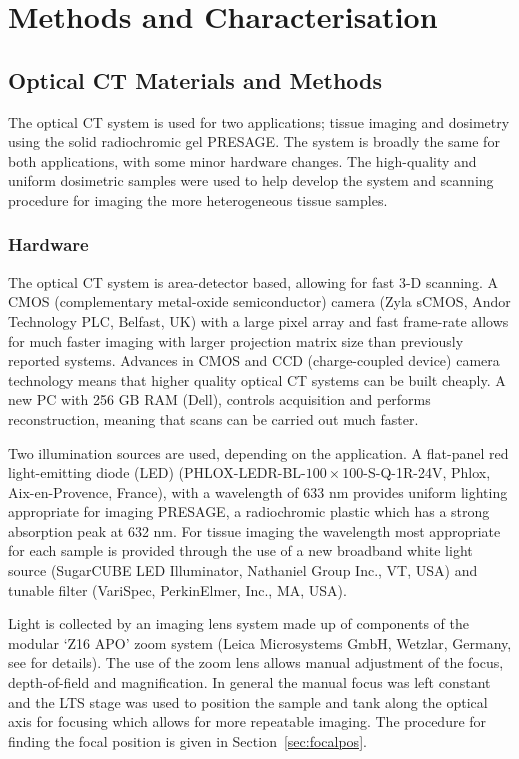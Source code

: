 \chapter{Methods and Characterisation}

\section{Optical CT Materials and Methods}
\label{sec:opticalCTmeth}
The optical CT system is used for two applications; tissue imaging and dosimetry using the solid radiochromic gel PRESAGE\textregistered. The system is broadly the same for both applications, with some minor hardware changes. The high-quality and uniform dosimetric samples were used to help develop the system and scanning procedure for imaging the more heterogeneous tissue samples.



\subsection{Hardware}
The  optical CT system is area-detector based, allowing for fast 3-D scanning. A CMOS (complementary metal-oxide semiconductor) camera (Zyla sCMOS, Andor Technology PLC, Belfast, UK) with a large pixel array and fast frame-rate allows for much faster imaging with larger projection matrix size than previously reported systems. Advances in CMOS and CCD (charge-coupled device) camera technology means that higher quality optical CT systems can be built cheaply.  A new PC with 256 GB RAM (Dell), controls acquisition and performs reconstruction, meaning that scans can be carried out much faster. 

Two illumination sources are used, depending on the application. A flat-panel red light-emitting diode (LED) 
(PHLOX-LEDR-BL-$100\times100$-S-Q-1R-24V, Phlox, Aix-en-Provence, France), with a wavelength of 633 nm provides uniform lighting appropriate for imaging PRESAGE\texttrademark , a radiochromic plastic which has a strong absorption peak at 632 nm. 
For tissue imaging the wavelength most appropriate for each sample is provided through the use of a  new broadband white light source (SugarCUBE LED Illuminator, Nathaniel Group Inc., VT, USA) and tunable filter (VariSpec, PerkinElmer, Inc., MA, USA). 

Light is collected by an imaging lens system made up of  components of the modular `Z16 APO' zoom system  (Leica Microsystems GmbH, Wetzlar, Germany, see \cite{Doran:2010hn} for details). The use of the zoom lens allows manual adjustment of the focus, depth-of-field and magnification. In general the manual focus was left constant and the LTS stage was used to position the sample and tank along the optical axis for focusing which allows for more repeatable imaging. The procedure for finding the focal position is given  in Section~\ref{sec:focalpos}.

